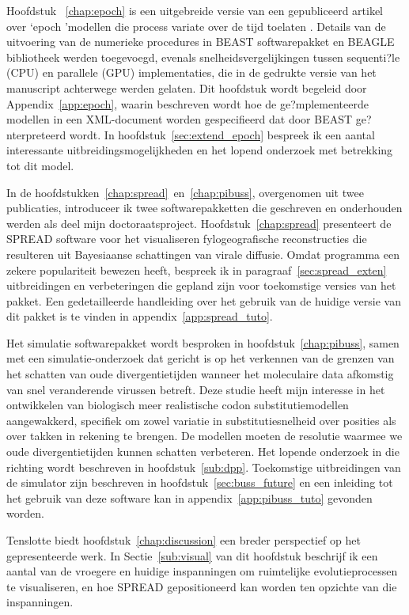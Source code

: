 Hoofdstuk ~\ref{chap:epoch} is een uitgebreide versie van een gepubliceerd artikel over `epoch 'modellen die process variate over de tijd toelaten \citep{Bielejec2014a}.
Details van de uitvoering van de numerieke procedures in BEAST softwarepakket en BEAGLE bibliotheek werden toegevoegd, evenals snelheidsvergelijkingen tussen sequenti?le (CPU) en parallele (GPU) implementaties, die in de gedrukte versie van het manuscript achterwege werden gelaten.
Dit hoofdstuk wordt begeleid door Appendix~\ref{app:epoch}, waarin beschreven wordt hoe de ge?mplementeerde modellen in een XML-document worden gespecifieerd dat door BEAST ge?nterpreteerd wordt.
In hoofdstuk~\ref{sec:extend_epoch} bespreek ik een aantal interessante uitbreidingsmogelijkheden en het lopend onderzoek met betrekking tot dit model.

In de hoofdstukken~\ref{chap:spread}~en~\ref{chap:pibuss}, overgenomen uit twee publicaties, introduceer ik twee softwarepakketten die geschreven en onderhouden werden als deel mijn doctoraatsproject.
Hoofdstuk~\ref{chap:spread} presenteert de SPREAD software voor het visualiseren fylogeografische reconstructies die resulteren uit Bayesiaanse schattingen van virale diffusie.
Omdat programma een zekere populariteit bewezen heeft, bespreek ik in paragraaf~\ref{sec:spread_exten} uitbreidingen en verbeteringen die  gepland zijn voor toekomstige versies van het pakket.
Een gedetailleerde handleiding over het gebruik van de huidige versie van dit pakket is te vinden in appendix~\ref{app:spread_tuto}.

Het simulatie softwarepakket {\bussname} wordt besproken in hoofdstuk~\ref{chap:pibuss}, samen met een simulatie-onderzoek dat gericht is op het verkennen van de grenzen van het schatten van oude divergentietijden wanneer het moleculaire data afkomstig van snel veranderende virussen betreft.
Deze studie heeft mijn interesse in het ontwikkelen van biologisch meer realistische codon substitutiemodellen aangewakkerd, specifiek om zowel variatie in substitutiesnelheid over posities als over takken in rekening te brengen.
De modellen moeten de resolutie waarmee we oude divergentietijden kunnen schatten verbeteren. %
Het lopende onderzoek in die richting wordt beschreven in hoofdstuk~\ref{sub:dpp}.
Toekomstige uitbreidingen van de {\bussname} simulator zijn beschreven in hoofdstuk~\ref{sec:buss_future} en een inleiding tot het gebruik van deze software kan in appendix~\ref{app:pibuss_tuto} gevonden worden.

Tenslotte biedt hoofdstuk~\ref{chap:discussion} een breder perspectief op het gepresenteerde werk.
In Sectie~\ref{sub:visual} van dit hoofdstuk beschrijf ik een aantal van de vroegere en huidige inspanningen om ruimtelijke evolutieprocessen te visualiseren, en hoe SPREAD gepositioneerd kan worden ten opzichte van die inspanningen.

